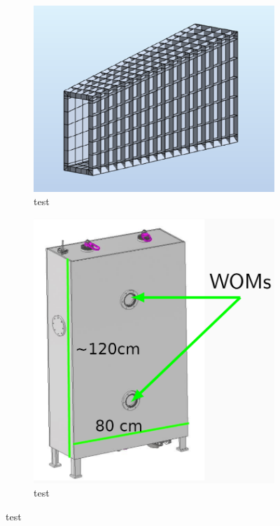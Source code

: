 \begin{figure}
	\centering
	\begin{subfigure}[b]{0.25\textwidth}
		\centering
		\includegraphics[width=.9\textwidth]{pictures/sbt_structure_sceleton}
		\caption{test}
		\label{fig:sbt_structure_sceleton}
	\end{subfigure}
	\begin{subfigure}[b]{0.25\textwidth}
		\centering
		\includegraphics[width=.9\textwidth]{pictures/sbt_structure_cell}
		\caption{test}
		\label{fig:sbt_structure_cell}

\end{subfigure}
\end{figure}
